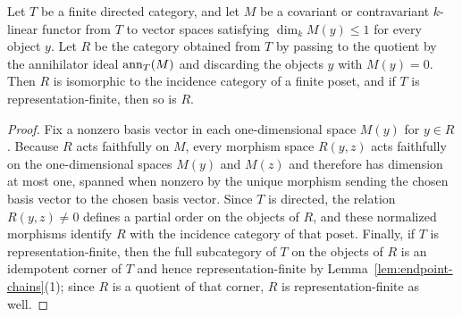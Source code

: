\begin{lemma}
\label{lem:thin-module-incidence}
Let $T$ be a finite directed category, and let $M$ be a covariant or
contravariant $k$-linear functor from $T$ to vector spaces satisfying
$\dim_k M(y)\leq1$ for every object $y$. Let $R$ be the category obtained
from $T$ by passing to the quotient by the annihilator ideal $\operatorname{ann}_T(M)$ and
discarding the objects $y$ with $M(y)=0$. Then $R$ is isomorphic to the
incidence category of a finite poset, and if $T$ is representation-finite,
then so is $R$.
\end{lemma}
\begin{proof}
Fix a nonzero basis vector in each one-dimensional space $M(y)$ for $y\in R$.
Because $R$ acts faithfully on $M$, every morphism space $R(y,z)$ acts
faithfully on the one-dimensional spaces $M(y)$ and $M(z)$ and therefore has
dimension at most one, spanned when nonzero by the unique morphism sending
the chosen basis vector to the chosen basis vector. Since $T$ is directed,
the relation $R(y,z)\ne0$ defines a partial order on the objects of $R$, and
these normalized morphisms identify $R$ with the incidence category of that
poset. Finally, if $T$ is representation-finite, then the full subcategory of
$T$ on the objects of $R$ is an idempotent corner of $T$ and hence
representation-finite by Lemma~\ref{lem:endpoint-chains}(1); since $R$ is a
quotient of that corner, $R$ is representation-finite as well.
\end{proof}

